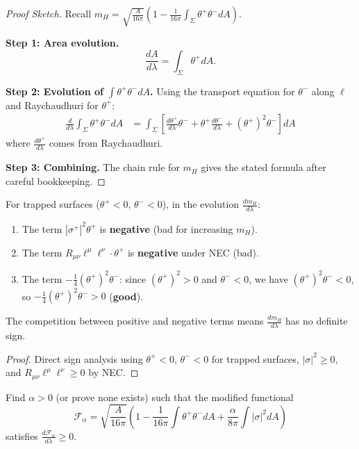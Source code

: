 \begin{proof}[Proof Sketch]
Recall $m_H = \sqrt{\frac{A}{16\pi}}\left(1 - \frac{1}{16\pi}\int_\Sigma \theta^+\theta^- dA\right)$.

\textbf{Step 1: Area evolution.}
\begin{equation}
    \frac{dA}{d\lambda} = \int_\Sigma \theta^+ dA.
\end{equation}

\textbf{Step 2: Evolution of $\int\theta^+\theta^- dA$.}
Using the transport equation for $\theta^-$ along $\ell$ and Raychaudhuri for $\theta^+$:
\begin{align}
    \frac{d}{d\lambda}\int_\Sigma \theta^+\theta^- dA &= \int_\Sigma \left[\frac{d\theta^+}{d\lambda}\theta^- + \theta^+\frac{d\theta^-}{d\lambda} + (\theta^+)^2\theta^-\right] dA
\end{align}
where $\frac{d\theta^+}{d\lambda}$ comes from Raychaudhuri.

\textbf{Step 3: Combining.}
The chain rule for $m_H$ gives the stated formula after careful bookkeeping.
\end{proof}

\begin{proposition}\label{prop:signanalysis}
For trapped surfaces ($\theta^+ < 0$, $\theta^- < 0$), in the evolution $\frac{dm_H}{d\lambda}$:
\begin{enumerate}
    \item The term $|\sigma^+|^2 \theta^+$ is \textbf{negative} (bad for increasing $m_H$).
    \item The term $R_{\mu\nu}\ell^\mu\ell^\nu \cdot \theta^+$ is \textbf{negative} under NEC (bad).
    \item The term $-\frac{1}{4}(\theta^+)^2\theta^-$: since $(\theta^+)^2 > 0$ and $\theta^- < 0$, we have $(\theta^+)^2\theta^- < 0$, so $-\frac{1}{4}(\theta^+)^2\theta^- > 0$ (\textbf{good}).
\end{enumerate}
The competition between positive and negative terms means $\frac{dm_H}{d\lambda}$ has no definite sign.
\end{proposition}

\begin{proof}
Direct sign analysis using $\theta^+ < 0$, $\theta^- < 0$ for trapped surfaces, $|\sigma|^2 \geq 0$, and $R_{\mu\nu}\ell^\mu\ell^\nu \geq 0$ by NEC.
\end{proof}

\begin{openproblem}\label{open:optimal}
Find $\alpha > 0$ (or prove none exists) such that the modified functional
\begin{equation}
    \mathcal{F}_\alpha = \sqrt{\frac{A}{16\pi}}\left(1 - \frac{1}{16\pi}\int\theta^+\theta^- dA + \frac{\alpha}{8\pi}\int|\sigma|^2 dA\right)
\end{equation}
satisfies $\frac{d\mathcal{F}_\alpha}{d\lambda} \geq 0$.
\end{openproblem}

